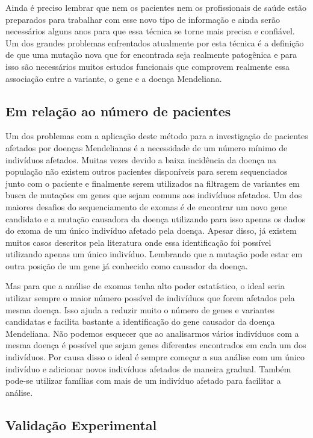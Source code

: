 Ainda é preciso lembrar que nem os pacientes nem os profissionais de saúde estão preparados para trabalhar com esse novo tipo de informação e ainda serão necessários alguns anos para que essa técnica se torne mais precisa e confiável. Um dos grandes problemas enfrentados atualmente por esta técnica é a definição de que uma mutação nova que for encontrada seja realmente patogênica e para isso são necessários muitos estudos funcionais que comprovem realmente essa associação entre a variante, o gene e a doença Mendeliana. 

\subsection{Em relação ao número de pacientes}

Um dos problemas com a aplicação deste método para a investigação de pacientes afetados por doenças Mendelianas é a necessidade de um número mínimo de indivíduos afetados. Muitas vezes devido a baixa incidência da doença na população não existem outros pacientes disponíveis para serem sequenciados junto com o paciente e finalmente serem utilizados na filtragem de variantes em busca de mutações em genes que sejam comuns aos indivíduos afetados. Um dos maiores desafios do sequenciamento de exomas é de encontrar um novo gene candidato e a mutação causadora da doença utilizando para isso apenas os dados do exoma de um único indivíduo afetado pela doença. Apesar disso, já existem muitos casos descritos pela literatura onde essa identificação foi possível utilizando apenas um único indivíduo. Lembrando que a mutação pode estar em outra posição de um gene já conhecido como causador da doença.

Mas para que a análise de exomas tenha alto poder estatístico, o ideal seria utilizar sempre o maior número possível de indivíduos que forem afetados pela mesma doença. Isso ajuda a reduzir muito o número de genes e variantes candidatas e facilita bastante a identificação do gene causador da doença Mendeliana. Não podemos esquecer que ao analisarmos vários indivíduos com a mesma doença é possível que sejam  genes diferentes encontrados em cada um dos indivíduos. Por causa disso o ideal é sempre começar a sua análise com um único indivíduo e adicionar novos indivíduos afetados de maneira gradual. Também pode-se utilizar famílias com mais de um indivíduo afetado para facilitar a análise.

\subsection{Validação Experimental}

